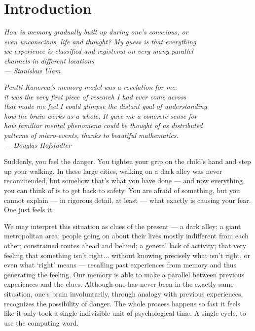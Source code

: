 
\chapter{Introduction}

\bigskip

\begin{flushright}{\slshape
    {How is memory gradually built up during one's conscious, or\\
    even unconscious, life and thought?  My guess is that everything \\
    we experience is classified and registered on very many parallel \\
    channels in different locations} \\ \medskip
    --- Stanislaw Ulam}

    \bigskip
    \bigskip
    {\slshape Pentti Kanerva's memory model was a revelation for me: \\
it was the very first piece of research I had ever come across\\
that made me feel I could glimpse the distant goal of understanding \\
how the brain works as a whole. It gave me a concrete sense for\\
how familiar mental phenomena could be thought of as distributed\\
patterns of micro-events, thanks to beautiful mathematics. \\ \medskip
--- Douglas Hofstadter}


\end{flushright}
\bigskip
\bigskip



Suddenly, you feel the danger.  You tighten your grip on the child's hand and step up your walking.  In these large cities, walking on a dark alley was never recommended, but somehow that's what you have done --- and now everything you can think of is to get back to safety.  You are afraid of something, but you cannot explain --- in rigorous detail, at least --- what exactly is causing your fear. One just feels it.

We may interpret this situation as clues of the present --- a dark alley; a giant metropolitan area; people going on about their lives mostly indifferent from each other; constrained routes ahead and behind; a general lack of activity; that very feeling that something isn't right... without knowing precisely what isn't right, or even what `right' means --- recalling past experiences from memory and thus generating the feeling. Our memory is able to make a parallel between previous experiences and the clues. Although one has never been in the exactly same situation, one's brain involuntarily, through analogy with previous experiences, recognizes the possibility of danger. The whole process happens so fast it feels like it only took a single indivisible unit of psychological time.  A single cycle, to use the computing word.

